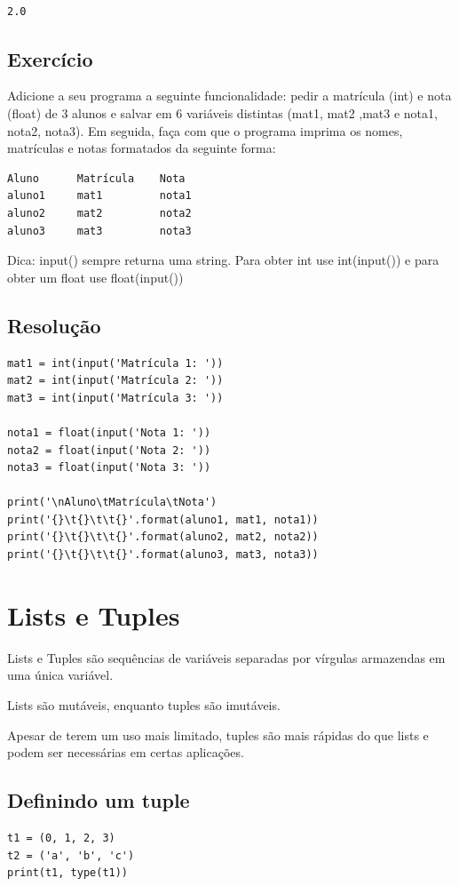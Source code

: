 \documentclass[presentation]{beamer}
\begin{document}
\begin{verbatim}

2.0
\end{verbatim}
\subsection{Exercício}
\label{sec:orgheadline43}
Adicione a seu programa a seguinte funcionalidade: pedir a matrícula (int) e nota (float) de 3 alunos e salvar em 6 variáveis distintas (mat1, mat2 ,mat3 e nota1, nota2, nota3). Em seguida, faça com que o programa imprima os nomes, matrículas e notas formatados da seguinte forma: 
\begin{verbatim}
Aluno      Matrícula    Nota
aluno1     mat1         nota1
aluno2     mat2         nota2
aluno3     mat3         nota3
\end{verbatim}

Dica: input() sempre returna uma string. Para obter int use int(input()) e para obter um float use float(input())
\subsection{Resolução}
\label{sec:orgheadline44}
\begin{verbatim}
mat1 = int(input('Matrícula 1: '))
mat2 = int(input('Matrícula 2: '))
mat3 = int(input('Matrícula 3: '))

nota1 = float(input('Nota 1: '))
nota2 = float(input('Nota 2: '))
nota3 = float(input('Nota 3: '))

print('\nAluno\tMatrícula\tNota')
print('{}\t{}\t\t{}'.format(aluno1, mat1, nota1))
print('{}\t{}\t\t{}'.format(aluno2, mat2, nota2))
print('{}\t{}\t\t{}'.format(aluno3, mat3, nota3))
\end{verbatim}
\section{Lists e Tuples}
\label{sec:orgheadline58}
Lists e Tuples são sequências de variáveis separadas por vírgulas armazendas em uma única variável. 

Lists são mutáveis, enquanto tuples são imutáveis.

Apesar de terem um uso mais limitado, tuples são mais rápidas do que lists e podem ser necessárias em certas aplicações.
\subsection{Definindo um tuple}
\label{sec:orgheadline46}
\begin{verbatim}
t1 = (0, 1, 2, 3)
t2 = ('a', 'b', 'c')
print(t1, type(t1))
\end{verbatim}
\end{document}
